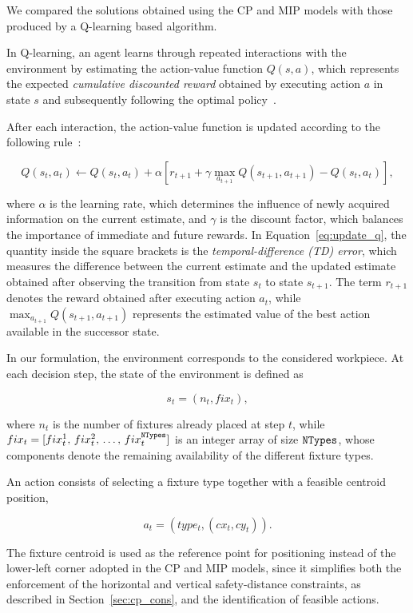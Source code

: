 \label{sec:rl_algorithm}

We compared the solutions obtained using the CP and MIP models with those produced by a Q-learning based algorithm.

In Q-learning, an agent learns through repeated interactions with the environment by estimating the action-value function \(Q(s,a)\), which represents the expected \textit{cumulative discounted reward} obtained by executing action \(a\) in state \(s\) and subsequently following the optimal policy~\cite{watkins1992q}.

After each interaction, the action-value function is updated according to the following rule~\cite{krose1995learning}:

\begin{equation}
	Q(s_t,a_t) \leftarrow Q(s_t,a_t)
	+ \alpha
	\left[
	r_{t+1}
	+ \gamma \max_{a_{t+1}}Q(s_{t+1},a_{t+1})
	- Q(s_t,a_t)
	\right],
	\label{eq:update_q}
\end{equation}

where \(\alpha\) is the learning rate, which determines the influence of newly acquired information on the current estimate, and \(\gamma\) is the discount factor, which balances the importance of immediate and future rewards. In Equation~\eqref{eq:update_q}, the quantity inside the square brackets is the \emph{temporal-difference (TD) error}, which measures the difference between the current estimate and the updated estimate obtained after observing the transition from state \(s_t\) to state \(s_{t+1}\). The term \(r_{t+1}\) denotes the reward obtained after executing action \(a_t\), while \(\max_{a_{t+1}}Q(s_{t+1},a_{t+1})\) represents the estimated value of the best action available in the successor state.

In our formulation, the environment corresponds to the considered workpiece. At each decision step, the state of the environment is defined as

\[
s_t=(n_t,fix_t),
\]

where \(n_t\) is the number of fixtures already placed at step \(t\), while
\(fix_t=[fix_t^{1},\,fix_t^{2},\,\ldots,\,fix_t^{\mathtt{NTypes}}]\)
is an integer array of size \(\mathtt{NTypes}\), whose components denote the remaining availability of the different fixture types.

An action consists of selecting a fixture type together with a feasible centroid position,

\[
a_t=(type_t,(cx_t,cy_t)).
\]

The fixture centroid is used as the reference point for positioning instead of the lower-left corner adopted in the CP and MIP models, since it simplifies both the enforcement of the horizontal and vertical safety-distance constraints, as described in Section~\ref{sec:cp_cons}, and the identification of feasible actions.

